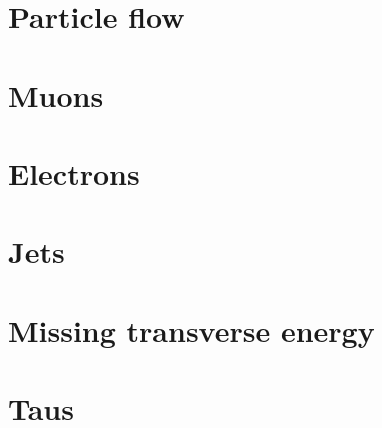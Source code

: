 \section{Particle flow}

\section{Muons}

\section{Electrons}

\section{Jets}

\section{Missing transverse energy}

\section{Taus}